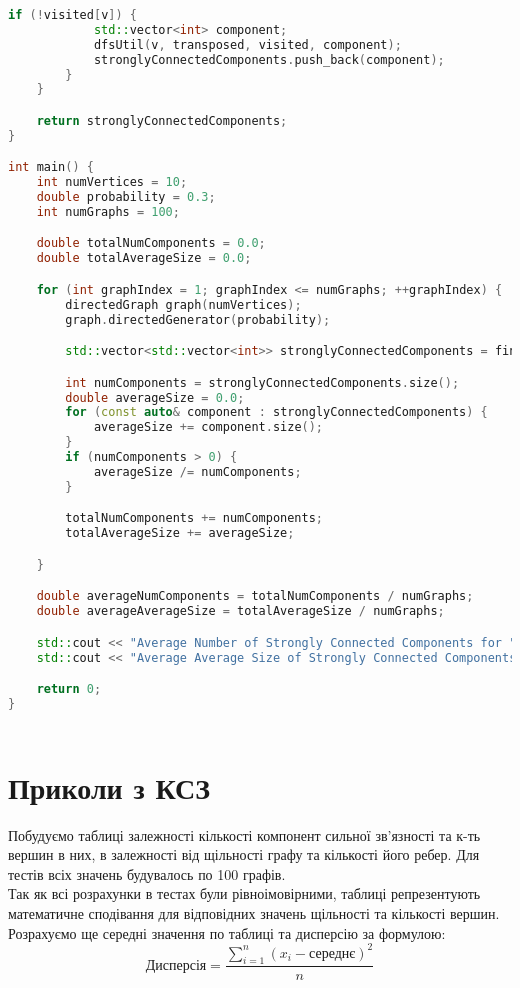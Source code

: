 \documentclass{article}
\begin{document}
\begin {small}
\begin{lstlisting}[language=C++]
        if (!visited[v]) {
            std::vector<int> component;
            dfsUtil(v, transposed, visited, component);
            stronglyConnectedComponents.push_back(component);
        }
    }

    return stronglyConnectedComponents;
}

int main() {
    int numVertices = 10;
    double probability = 0.3;
    int numGraphs = 100;

    double totalNumComponents = 0.0;
    double totalAverageSize = 0.0;

    for (int graphIndex = 1; graphIndex <= numGraphs; ++graphIndex) {
        directedGraph graph(numVertices);
        graph.directedGenerator(probability);

        std::vector<std::vector<int>> stronglyConnectedComponents = findStronglyConnectedComponents(graph.matrix);

        int numComponents = stronglyConnectedComponents.size();
        double averageSize = 0.0;
        for (const auto& component : stronglyConnectedComponents) {
            averageSize += component.size();
        }
        if (numComponents > 0) {
            averageSize /= numComponents;
        }

        totalNumComponents += numComponents;
        totalAverageSize += averageSize;

    }

    double averageNumComponents = totalNumComponents / numGraphs;
    double averageAverageSize = totalAverageSize / numGraphs;

    std::cout << "Average Number of Strongly Connected Components for " << numGraphs << " Graphs: " << averageNumComponents << std::endl;
    std::cout << "Average Average Size of Strongly Connected Components for " << numGraphs << " Graphs: " << averageAverageSize << std::endl;

    return 0;
}



\end{lstlisting}
\end{small}

\newpage

\section{Приколи з КСЗ}
Побудуємо таблиці залежності кількості компонент сильної зв'язності та к-ть вершин в них, в залежності від щільності графу та кількості його ребер. Для тестів всіх значень будувалось по 100 графів. \\
Так як всі розрахунки в тестах були рівноімовірними, таблиці репрезентують математичне сподівання для відповідних значень щільності та кількості вершин.\\
Розрахуємо ще середні значення по таблиці та дисперсію за формулою:\\
\begin{equation}
\text{Дисперсія} = \frac{\sum_{i=1}^{n} (x_i - \text{середнє})^2}{n}
\end{equation}
\\
\end{document}
